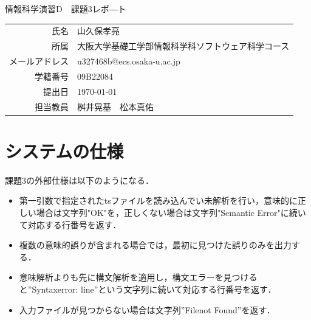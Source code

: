 \documentclass[dvipdfmx]{jarticle}
\begin{document}
\begin{titlepage}
    \begin{center}
        {\huge 情報科学演習D　課題3レポ―ト}
        \vspace{180pt}\\
        \begin{tabular}{rl}
            氏名 & 山久保孝亮\\
            所属 & 大阪大学基礎工学部情報科学科ソフトウェア科学コース\\
            メールアドレス & u327468b@ecs.osaka-u.ac.jp\\
            学籍番号 & 09B22084\\
            提出日 & \today\\
            担当教員 & 桝井晃基　松本真佑
        \end{tabular}
    \end{center}
\end{titlepage}
\section{システムの仕様}
課題3の外部仕様は以下のようになる．
\begin{itemize}
  \item 第一引数で指定されたtsファイルを読み込んでい未解析を行い，意味的に正しい場合は文字列"OK"を，正しくない場合は文字列"Semantic Error"に続いて対応する行番号を返す．
  \item 複数の意味的誤りが含まれる場合では，最初に見つけた誤りのみを出力する．
  \item 意味解析よりも先に構文解析を適用し，構文エラーを見つけると”Syntaxerror: line”という文字列に続いて対応する行番号を返す．
  \item 入力ファイルが見つからない場合は文字列”Filenot Found”を返す．
\end{itemize}
\end{document}
